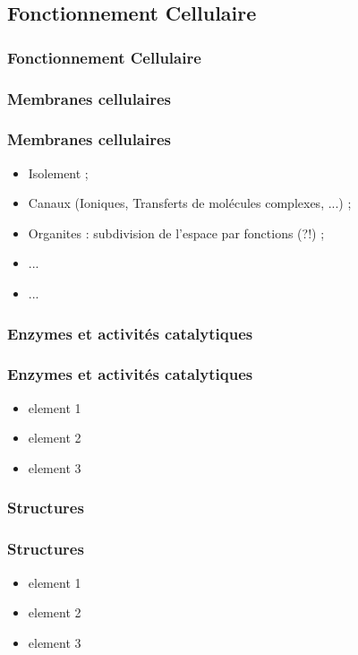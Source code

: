 \documentclass{beamer}
\begin{document}
\subsection{Fonctionnement Cellulaire}
\begin{frame}
	\frametitle{ Fonctionnement Cellulaire }
	\tableofcontents[sections=1,currentsection,subsectionstyle=show/shaded/hide]
\end{frame} 

\subsubsection{ Membranes cellulaires }
\begin{frame}
	\frametitle{ Membranes cellulaires }
	\begin{itemize}
		\item Isolement ; 
		\item Canaux (Ioniques, Transferts de mol{\'e}cules complexes, ...) ; 
		\item Organites : subdivision de l'espace par fonctions (?!) ; 
		\item ... 
		\item ... 
	\end{itemize}
\end{frame}

\subsubsection{ Enzymes et activit{\'e}s catalytiques }
\begin{frame}
	\frametitle{ Enzymes et activit{\'e}s catalytiques }
	\begin{itemize}
		\item element 1
		\item element 2
		\item element 3
	\end{itemize}
\end{frame}

\subsubsection{ Structures }
\begin{frame}
	\frametitle{ Structures }
	\begin{itemize}
		\item element 1
		\item element 2
		\item element 3
	\end{itemize}
\end{frame}
\end{document}
